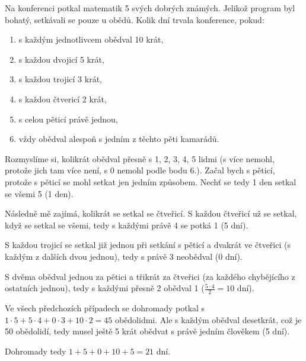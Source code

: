 \documentclass[12pt]{article}					%
\begin{document}
\begin{priklad}[1]
    Na konferenci potkal matematik 5 svých dobrých známých. Jelikož program byl bohatý, setkávali se pouze u obědů. Kolik dní trvala konference, pokud:
        
    \begin{enumerate}
        \item s každým jednotlivcem obědval 10 krát,
        \item s každou dvojicí 5 krát,
        \item s každou trojicí 3 krát,
        \item s každou čtvericí 2 krát,
        \item s celou pěticí právě jednou,
        \item vždy obědval alespoň s jedním z těchto pěti kamarádů.
    \end{enumerate}

    \begin{reseni}
        Rozmyslíme si, kolikrát obědval přesně s 1, 2, 3, 4, 5 lidmi (s více nemohl, protože jich tam více není, s 0 nemohl podle bodu 6.). Začal bych s pěticí, protože s pěticí se mohl setkat jen jedním způsobem. Nechť se tedy 1 den setkal se všemi 5 (1 den).

        Následně mě zajímá, kolikrát se setkal se čtveřicí. S každou čtveřicí už se setkal, když se setkal se všemi, tedy s každými právě 4 se potká 1 (5 dní).

        S každou trojicí se setkal již jednou při setkání s pěticí a dvakrát ve čtveřici (s každým z dalších dvou jednou), tedy s právě 3 neobědval (0 dní).

        S dvěma obědval jednou za pětici a třikrát za čtveřici (za každého chybějícího z ostatních jednou), tedy s každými přesně 2 obědval 1 ($\frac{5·4}{2}=10$ dní).

        Ve všech předchozích případech se dohromady potkal s $1·5 + 5·4 + 0·3 + 10 · 2 = 45$ obědolidmi. Ale s každým obědval desetkrát, což je 50 obědolidí, tedy musel ještě 5 krát obědvat s právě jedním člověkem (5 dní).

        Dohromady tedy $1+5+0+10+5 = 21$ dní.
    \end{reseni}

\end{priklad}

\pagebreak
\end{document}

